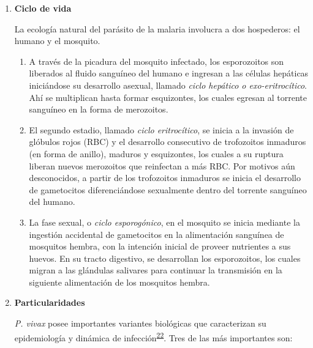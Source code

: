 \documentclass[a4paper]{article}
\providecommand{\tightlist}{%
  \setlength{\itemsep}{0pt}\setlength{\parskip}{0pt}}
\begin{document}
\begin{enumerate}
  \begin{enumerate}
  \def\labelenumii{\roman{enumii}.}
  \item
    \textbf{Ciclo de vida}

    La ecología natural del parásito de la malaria involucra a dos
    hospederos: el humano y el mosquito.

    \begin{enumerate}
    \def\labelenumiii{\arabic{enumiii}.}
    \tightlist
    \item
      A través de la picadura del mosquito infectado, los esporozoitos
      son liberados al fluido sanguíneo del humano e ingresan a las
      células hepáticas iniciándose su desarrollo asexual, llamado
      \emph{ciclo hepático o exo-eritrocítico}. Ahí se multiplican hasta
      formar esquizontes, los cuales egresan al torrente sanguíneo en la
      forma de merozoitos.
    \item
      El segundo estadio, llamado \emph{ciclo eritrocítico}, se inicia a
      la invasión de glóbulos rojos (RBC) y el desarrollo consecutivo de
      trofozoitos inmaduros (en forma de anillo), maduros y esquizontes,
      los cuales a su ruptura liberan nuevos merozoitos que reinfectan a
      más RBC. Por motivos aún desconocidos, a partir de los trofozoitos
      inmaduros se inicia el desarrollo de gametocitos diferenciándose
      sexualmente dentro del torrente sanguíneo del humano.
    \item
      La fase sexual, o \emph{ciclo esporogónico}, en el mosquito se
      inicia mediante la ingestión accidental de gametocitos en la
      alimentación sanguínea de mosquitos hembra, con la intención
      inicial de proveer nutrientes a sus huevos. En su tracto
      digestivo, se desarrollan los esporozoitos, los cuales migran a
      las glándulas salivares para continuar la transmisión en la
      siguiente alimentación de los mosquitos hembra.
    \end{enumerate}
  \item
    \textbf{Particularidades}

    \emph{P. vivax} posee importantes variantes biológicas que
    caracterizan su epidemiología y dinámica de
    infección\textsuperscript{\protect\hyperlink{ref-howes2016global}{22}}.
    Tres de las más importantes son:


\end{enumerate}
\end{enumerate}
\end{document}
